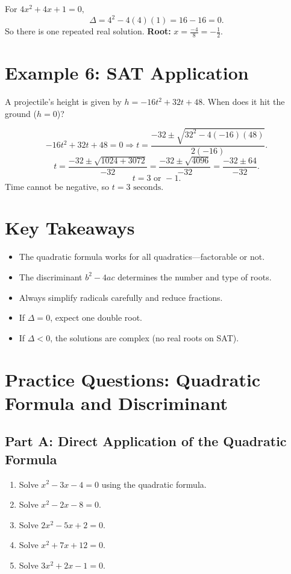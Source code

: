 \documentclass[14pt]{extarticle}
\begin{document}
For \(4x^2 + 4x + 1 = 0,\)
\[
\Delta = 4^2 - 4(4)(1) = 16 - 16 = 0.
\]
So there is one repeated real solution.  
\textbf{Root:} \(x = \frac{-4}{8} = -\tfrac{1}{2}.\)

\section*{Example 6: SAT Application}

A projectile’s height is given by \(h = -16t^2 + 32t + 48.\)  
When does it hit the ground (\(h = 0\))?

\[
-16t^2 + 32t + 48 = 0 \Rightarrow t = \frac{-32 \pm \sqrt{32^2 - 4(-16)(48)}}{2(-16)}.
\]
\[
t = \frac{-32 \pm \sqrt{1024 + 3072}}{-32}
= \frac{-32 \pm \sqrt{4096}}{-32}
= \frac{-32 \pm 64}{-32}.
\]
\[
t = 3 \text{ or } -1.
\]
Time cannot be negative, so \(\boxed{t = 3\text{ seconds}}\).

\section*{Key Takeaways}
\begin{itemize}
  \item The quadratic formula works for all quadratics—factorable or not.
  \item The discriminant \(b^2 - 4ac\) determines the number and type of roots.
  \item Always simplify radicals carefully and reduce fractions.
  \item If \(\Delta = 0\), expect one double root.
  \item If \(\Delta < 0\), the solutions are complex (no real roots on SAT).
\end{itemize}

\newpage


\section*{Practice Questions: Quadratic Formula and Discriminant}

\subsection*{Part A: Direct Application of the Quadratic Formula}
\begin{enumerate}
  \item Solve \(x^2 - 3x - 4 = 0\) using the quadratic formula.
  \item Solve \(x^2 - 2x - 8 = 0.\)
  \item Solve \(2x^2 - 5x + 2 = 0.\)
  \item Solve \(x^2 + 7x + 12 = 0.\)
  \item Solve \(3x^2 + 2x - 1 = 0.\)
\end{enumerate}
\end{document}
